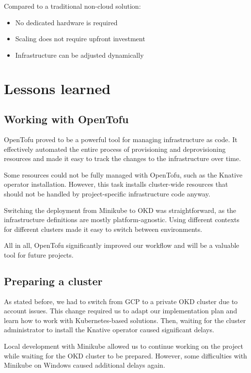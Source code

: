 \documentclass[12pt,a4paper,onecolumn,twoside]{tau-class/tau}
\begin{document}
Compared to a traditional non-cloud solution:

\begin{itemize}
    \item No dedicated hardware is required
    \item Scaling does not require upfront investment
    \item Infrastructure can be adjusted dynamically
\end{itemize}

\section{Lessons learned}

\subsection{Working with OpenTofu}

OpenTofu proved to be a powerful tool for managing infrastructure as code. It effectively automated the entire process of provisioning and deprovisioning resources and made it easy to track the changes to the infrastructure over time.

Some resources could not be fully managed with OpenTofu, such as the Knative operator installation. However, this task installs cluster-wide resources that should not be handled by project-specific infrastructure code anyway.

Switching the deployment from Minikube to OKD was straightforward, as the infrastructure definitions are mostly platform-agnostic. Using different contexts for different clusters made it easy to switch between environments.

All in all, OpenTofu significantly improved our workflow and will be a valuable tool for future projects.

\subsection{Preparing a cluster}

As stated before, we had to switch from GCP to a private OKD cluster due to account issues. This change required us to adapt our implementation plan and learn how to work with Kubernetes-based solutions. Then, waiting for the cluster administrator to install the Knative operator caused significant delays.

Local development with Minikube allowed us to continue working on the project while waiting for the OKD cluster to be prepared. However, some difficulties with Minikube on Windows caused additional delays again.
\end{document}
